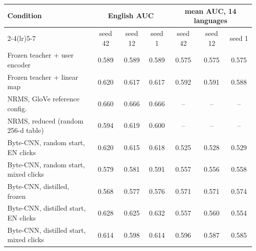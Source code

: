 \begin{tabular}{lcccccc}
\toprule
Condition & \multicolumn{3}{c}{English AUC} & \multicolumn{3}{c}{mean AUC, 14 languages}\\
\cmidrule(lr){2-4}\cmidrule(lr){5-7}
 & seed 42 & seed 12 & seed 1 & seed 42 & seed 12 & seed 1\\
\midrule
Frozen teacher + user encoder & 0.589 & 0.589 & 0.589 & 0.575 & 0.575 & 0.575\\
Frozen teacher + linear map & 0.620 & 0.617 & 0.617 & 0.592 & 0.591 & 0.588\\
NRMS, GloVe reference config. & 0.660 & 0.666 & 0.666 & -- & -- & --\\
NRMS, reduced (random 256-d table) & 0.594 & 0.619 & 0.600 & -- & -- & --\\
Byte-CNN, random start, EN clicks & 0.620 & 0.615 & 0.618 & 0.525 & 0.528 & 0.529\\
Byte-CNN, random start, mixed clicks & 0.579 & 0.581 & 0.591 & 0.557 & 0.556 & 0.558\\
Byte-CNN, distilled, frozen & 0.568 & 0.577 & 0.576 & 0.571 & 0.571 & 0.574\\
Byte-CNN, distilled start, EN clicks & 0.628 & 0.625 & 0.632 & 0.557 & 0.560 & 0.554\\
Byte-CNN, distilled start, mixed clicks & 0.614 & 0.598 & 0.614 & 0.596 & 0.587 & 0.585\\
\bottomrule
\end{tabular}
